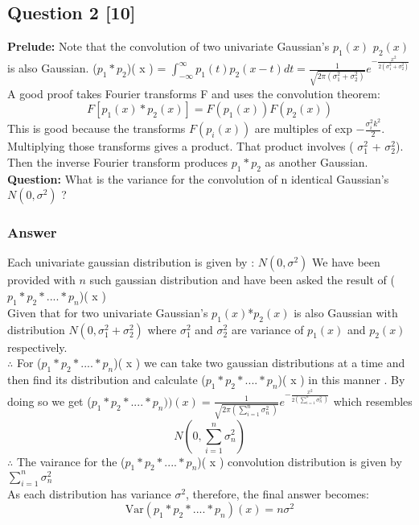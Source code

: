 \documentclass[12pt]{article}
\begin{document}
   
\subsection*{Question 2 [10]}
\textbf{Prelude:} Note that the convolution of two univariate Gaussian's \( p_1(x) \) \( p_2(x) \) is also Gaussian. (\( p_1 * p_2 \))( x ) = \( \int_{-\infty}^{\infty} p_1(t) p_2(x - t) dt = \frac{1}{\sqrt{2\pi \left( \sigma_1^2 + \sigma_2^2 \right)}} e^{-\frac{x^2}{2 \left( \sigma_1^2 + \sigma_2^2 \right)}} \) A good proof takes Fourier transforms F and uses the convolution theorem:
\[ F[p_1(x) * p_2(x)] = F(p_1(x)) F(p_2(x)) \]
This is good because the transforms \( F(p_i(x)) \) are multiples of exp \( -\frac{\sigma_i^2 k^2}{2} \). Multiplying those transforms gives a product. That product involves ( \( \sigma_1^2 \) + \( \sigma_2^2 \)). Then the inverse Fourier transform produces \( p_1 * p_2 \) as another Gaussian.
\textbf{Question:} What is the variance for the convolution of n identical Gaussian's \( N(0,  \sigma^2 )\) ?
\subsubsection*{Answer}
Each univariate gaussian distribution is given by :  \( N(0,  \sigma^2 )\)
We have been provided with \(n\) such gaussian distribution and have been asked the result of (\( p_1 * p_2*....*p_n \))( x ) \\
Given that for two univariate Gaussian's \( p_1(x) \)*\( p_2(x) \) is also Gaussian with distribution \( N(0,  \sigma_1^2+\sigma_2^2 )\) where \(\sigma_1^2\) and \(\sigma_2^2\) are variance of \( p_1(x) \) and \( p_2(x) \) respectively. \\
\(\therefore\)  For (\( p_1 * p_2*....*p_n \))( x ) we can take two gaussian distributions at a time and then find its distribution and calculate 
(\( p_1 * p_2*....*p_n \))( x ) in this manner .
By doing so we get (\( p_1 * p_2*....*p_n ))( x )=\frac{1}{\sqrt{2\pi \left(\sum_{i=1}^n \sigma_n^2\   \right)}} e^{-\frac{x^2}{2 \left( \sum_{i=1}^n \sigma_n^2\ \right)}} \) which resembles \[
N\left(0, \sum_{i=1}^n \sigma_n^2 \right)
\]
\(\therefore\) The vairance for the (\( p_1 * p_2*....*p_n \))( x ) convolution distribution is given by \(\sum_{i=1}^n \sigma_n^2\)\\
As each distribution has variance \( \sigma^2 \), therefore, the final answer becomes:
\[
\text{Var}(p_1 * p_2*....*p_n )(x) = n \sigma^2
\]
\end{document}
